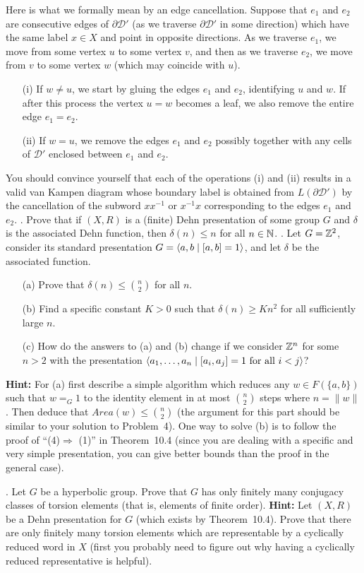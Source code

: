 \documentclass[12pt]{amsart}
\begin{document}
Here is what we formally mean by an edge cancellation. Suppose that $e_1$ and $e_2$
are consecutive edges of $\partial \mathcal D'$ (as we traverse $\partial \mathcal D'$ in some direction) which have the same label $x\in X$ and point in opposite directions.
As we traverse $e_1$, we move from some vertex $u$ to some vertex $v$, and then
as we traverse $e_2$, we move from $v$ to some vertex $w$ (which may coincide with $u$).

\begin{itemize}
\item[(i)] If $w\neq u$, we start by gluing the edges $e_1$ and $e_2$, identifying 
$u$ and $w$. If after this process the vertex $u=w$ becomes a leaf, we also remove the entire edge $e_1=e_2$.
\item[(ii)] If $w=u$, we remove the edges $e_1$ and $e_2$ possibly together with any cells of $\mathcal D'$ enclosed between $e_1$ and $e_2$.
\end{itemize}
You should convince yourself that each of the operations (i) and (ii) results in a valid van Kampen diagram whose boundary label is obtained from $L(\partial \mathcal D')$
by the cancellation of the subword $x x^{-1}$ or $x^{-1} x$ corresponding to the edges
$e_1$ and $e_2$.
. Prove that if $(X,R)$ is a (finite) Dehn presentation of some group $G$ and $\delta$ is the associated Dehn function,
then $\delta(n)\leq n$ for all $n\in{\mathbb N}$.
. Let $G={\mathbb Z}^2$, consider its standard presentation $G={\langle} a,b\mid [a,b]=1{\rangle}$, and let $\delta$ be the associated function.
\begin{itemize}
\item[(a)] Prove that $\delta(n)\leq {n\choose 2}$ for all $n$.
\item[(b)] Find a specific constant $K>0$ such that $\delta(n)\geq Kn^2$ for all sufficiently large $n$.
\item[(c)] How do the answers to (a) and (b) change if we consider ${\mathbb Z}^n$ for some $n>2$ with the presentation 
${\langle} a_1,\ldots, a_n \mid [a_i,a_j]=1 \mbox{ for all }i<j{\rangle}$?
\end{itemize}
{\bf Hint:} For (a) first describe a simple algorithm which reduces any 
$w\in F(\{a,b\})$ such that $w=_{G}1$ to the identity element in at most 
${n\choose 2}$ steps where $n=\|w\|$. Then deduce that $Area(w)\leq {n\choose 2}$
(the argument for this part should be similar to your solution to Problem~4). One way to solve (b) is to follow the proof of ``(4)$\Rightarrow$ (1)'' in Theorem~10.4 (since you are dealing with a specific and very simple presentation, you can give better bounds than the proof in the general case). 

. Let $G$ be a hyperbolic group. Prove that $G$ has only finitely many conjugacy classes of torsion elements (that is, elements of finite order). {\bf Hint:} Let
$(X,R)$ be a Dehn presentation for $G$ (which exists by Theorem~10.4). Prove that
there are only finitely many torsion elements which are representable by a cyclically
reduced word in $X$ (first you probably need to figure out why having a
cyclically reduced representative is helpful).
\end{document}

